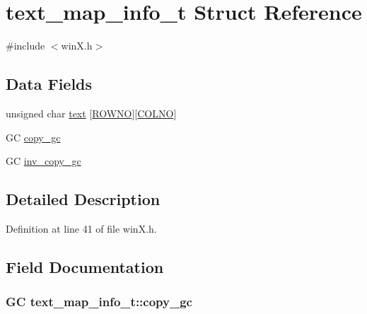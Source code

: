 \hypertarget{structtext__map__info__t}{\section{text\+\_\+map\+\_\+info\+\_\+t Struct Reference}
\label{structtext__map__info__t}
}


{\ttfamily \#include $<$win\+X.\+h$>$}

\subsection*{Data Fields}
\begin{DoxyCompactItemize}
\item 
unsigned char \hyperlink{structtext__map__info__t_ad278ca28ea443157e23f8030dc673a5d}{text} \mbox{[}\hyperlink{gnmap_8c_a9cce134868d97b23c35bcf1ff4a343d8}{R\+O\+W\+N\+O}\mbox{]}\mbox{[}\hyperlink{gnmap_8c_a308dbfcc29f5a427c0315f3cbf03c3ed}{C\+O\+L\+N\+O}\mbox{]}
\item 
G\+C \hyperlink{structtext__map__info__t_a4e3aedaf8e638c12ba150a0c848dc263}{copy\+\_\+gc}
\item 
G\+C \hyperlink{structtext__map__info__t_a4b413e5d7506a16b271d791babf99444}{inv\+\_\+copy\+\_\+gc}
\end{DoxyCompactItemize}


\subsection{Detailed Description}


Definition at line 41 of file win\+X.\+h.



\subsection{Field Documentation}
\hypertarget{structtext__map__info__t_a4e3aedaf8e638c12ba150a0c848dc263}{
\subsubsection[{copy\+\_\+gc}]{\setlength{\rightskip}{0pt plus 5cm}G\+C text\+\_\+map\+\_\+info\+\_\+t\+::copy\+\_\+gc}}\label{structtext__map__info__t_a4e3aedaf8e638c12ba150a0c848dc263}


